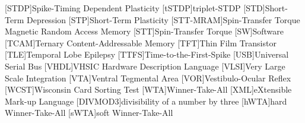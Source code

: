 \begin{acronym}
[STDP]{Spike-Timing Dependent Plasticity}
[tSTDP]{triplet-STDP}
[STD]{Short-Term Depression}
[STP]{Short-Term Plasticity}
[STT-MRAM]{Spin-Transfer Torque Magnetic Random Access Memory}
[STT]{Spin-Transfer Torque}
[SW]{Software}
[TCAM]{Ternary Content-Addressable Memory}
[TFT]{Thin Film Transistor}
[TLE]{Temporal Lobe Epilepsy}
[TTFS]{Time-to-the-First-Spike}
[USB]{Universal Serial Bus}
[VHDL]{VHSIC Hardware Description Language}
[VLSI]{Very Large Scale Integration}
[VTA]{Ventral Tegmental Area}
[VOR]{Vestibulo-Ocular Reflex}
[WCST]{Wisconsin Card Sorting Test}
[WTA]{Winner-Take-All}
[XML]{eXtensible Mark-up Language}
[DIVMOD3]{divisibility of a number by three}
[hWTA]{hard Winner-Take-All}
[sWTA]{soft Winner-Take-All}
\end{acronym}
